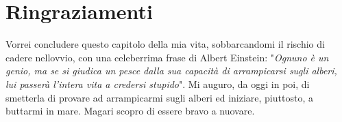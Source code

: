 \chapter*{Ringraziamenti} %
Vorrei concludere questo capitolo della mia vita, sobbarcandomi il rischio di cadere nellovvio, con una celeberrima frase di
Albert Einstein: "\textit{Ognuno è un genio, ma se si giudica un pesce dalla sua capacità di arrampicarsi
sugli alberi, lui passerà l'intera vita a credersi stupido}". Mi auguro, da oggi in poi, di smetterla di provare ad arrampicarmi sugli
alberi ed iniziare, piuttosto, a buttarmi in mare. Magari scopro di essere
bravo a nuovare.

\lipsum[1-3]